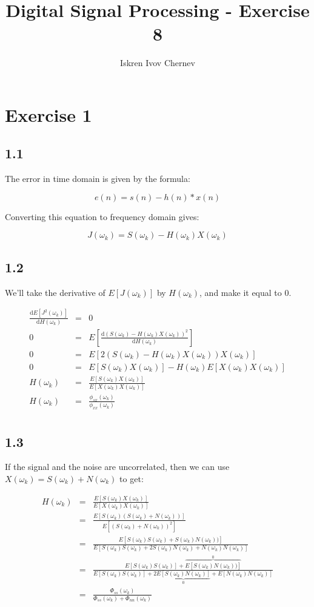 \documentclass[a4paper]{article}
\def\d{\mathrm{d}}
\def\w {\omega}
\begin{document}
\title{Digital Signal Processing - Exercise 8}
\author{Iskren Ivov Chernev}
\maketitle

\section*{Exercise 1}

\subsection*{1.1}

The error in time domain is given by the formula:

\[
  e(n) = s(n) - h(n) * x(n)
\]

Converting this equation to frequency domain gives:

\[
  J(\w_k) = S(\w_k) - H(\w_k) X(\w_k)
\]

\subsection*{1.2}

We'll take the derivative of $ E[J(\w_k)] $ by $ H(\w_k) $, and make it equal to 0.

\begin{eqnarray*}
\frac{\d E[J^2(\w_k)]}{\d H(\w_k)} &=& 0 \\
0 &=& E\left[ \frac{\d (S(\w_k) - H(\w_k) X(\w_k))^2}{ \d H(\w_k) } \right] \\
0 &=& E[ 2(S(\w_k) - H(\w_k)X(\w_k))X(\w_k) ] \\
0 &=& E[ S(\w_k)X(\w_k) ] - H(\w_k) E [ X(\w_k)X(\w_k) ] \\
H(\w_k) &=& \frac{E[ S(\w_k)X(\w_k) ]}{E [ X(\w_k)X(\w_k) ]} \\
H(\w_k) &=& \frac{\phi_{sx}(\w_k)}{\phi_{xx}(\w_k)} \\
\end{eqnarray*}

\subsection*{1.3}

If the signal and the noise are uncorrelated, then we can use $ X(\w_k) = S(\w_k) + N(\w_k) $ to get:

\begin{eqnarray*}
H(\w_k)
  &=& \frac{E[ S(\w_k)X(\w_k) ]}{E [ X(\w_k)X(\w_k) ]} \\
  &=& \frac{E[ S(\w_k)(S(\w_k) + N(\w_k)) ]}{E [ (S(\w_k) + N(\w_k))^2 ]} \\
  &=& \frac{E[ S(\w_k)S(\w_k) + S(\w_k)N(\w_k)) ]}{E [ S(\w_k)S(\w_k) + 2S(\w_k)N(\w_k) + N(\w_k)N(\w_k) ]} \\
  &=& \frac{E[ S(\w_k)S(\w_k) ] + \overbrace{E[ S(\w_k)N(\w_k)) ]}^{0}}
           {E[ S(\w_k)S(\w_k) ] + 2\underbrace{E[ S(\w_k)N(\w_k) ]}_{0} + E[ N(\w_k)N(\w_k) ]} \\
  &=& \frac{\Phi_{ss}(\w_k)}{\Phi_{ss}(\w_k) + \Phi_{nn}(\w_k)} \\
\end{eqnarray*}
\end{document}
